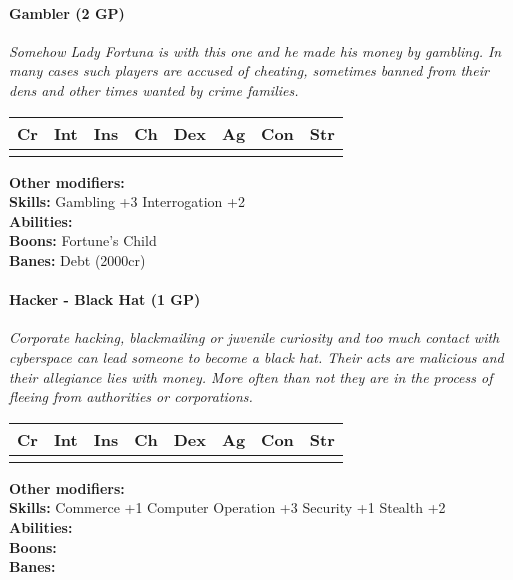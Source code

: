 \documentclass[12pt,a4paper,openany]{book}
\begin{document}
	\hrulefill
	\paragraph*{Gambler (2 GP)}
	\textit{Somehow Lady Fortuna is with this one and he made his money by gambling. In many cases such players are accused of cheating, sometimes banned from their dens and other times wanted by crime families.}\par
	\begin{tabular}{|l|l|l|l|l|l|l|l|}
		\hline
		Cr & Int & Ins & Ch & Dex & Ag & Con & Str \\ \hline
		&  &  &  &  &  &  &  \\ \hline
	\end{tabular}\par
	\noindent\textbf{Other modifiers:} \\
	\textbf{Skills:} Gambling +3
	Interrogation +2\\
	\textbf{Abilities:} \\
	\textbf{Boons:} Fortune's Child\\
	\textbf{Banes:} Debt (2000cr)\\
	
	\hrulefill
	\paragraph*{Hacker - Black Hat (1 GP)}
	\textit{Corporate hacking, blackmailing or juvenile curiosity and too much contact with cyberspace can lead someone to become a black hat. Their acts are malicious and their allegiance lies with money. More often than not they are in the process of fleeing from authorities or corporations.}\par
	\begin{tabular}{|l|l|l|l|l|l|l|l|}
		\hline
		Cr & Int & Ins & Ch & Dex & Ag & Con & Str \\ \hline
		&  &  &  &  &  &  &  \\ \hline
	\end{tabular}\par
	\noindent\textbf{Other modifiers:} \\
	\textbf{Skills:} Commerce +1
	Computer Operation +3
	Security +1
	Stealth +2\\
	\textbf{Abilities:} \\
	\textbf{Boons:} \\
	\textbf{Banes:} \\
	
	\hrulefill
\end{document}
